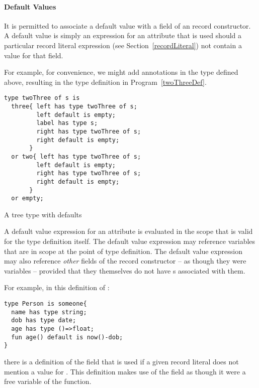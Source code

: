 \paragraph{Default Values}
\label{defaultValues}

It is permitted to associate a default value with a field of an record constructor. A default value is simply an expression for an attribute that is used should a particular record literal expression (see Section~\vref{recordLiteral}) not contain a value for that field.

For example, for convenience, we might add  annotations in the  type defined above, resulting in the type definition in Program~\vref{twoThreeDef}.
\begin{program}
\begin{lstlisting}
type twoThree of s is
  three{ left has type twoThree of s;
         left default is empty;
         label has type s;
         right has type twoThree of s;
         right default is empty;
       }
  or two{ left has type twoThree of s; 
         left default is empty;
         right has type twoThree of s;
         right default is empty;
       }
  or empty;
\end{lstlisting}
\caption{A  tree type with defaults}\label{twoThreeDef}
\end{program}

\begin{aside}
A default value expression for an attribute is evaluated in the scope that is valid for the type definition itself. The default value expression may reference variables that are in scope at the point of type definition. The default value expression may also reference \emph{other} fields of the record constructor -- as though they were variables -- provided that they themselves do not have s associated with them.

For example, in this definition of :
\begin{lstlisting}
type Person is someone{
  name has type string;
  dob has type date;
  age has type ()=>float;
  fun age() default is now()-dob;
}
\end{lstlisting}
there is a  definition of the  field that is used if a given  record literal does not mention a value for . This  definition makes use of the  field as though it were a free variable of the  function.
\end{aside}

